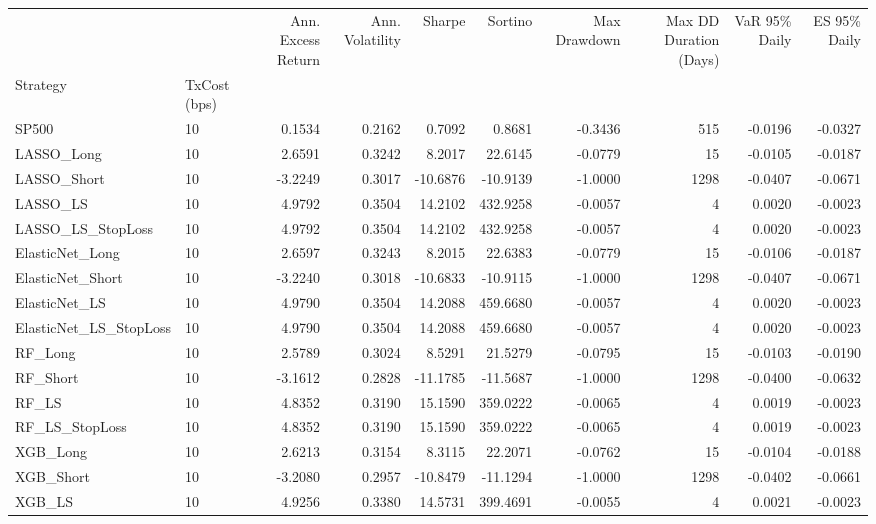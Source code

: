 \begin{tabular}{llrrrrrrrr}
\toprule
 &  & Ann. Excess Return & Ann. Volatility & Sharpe & Sortino & Max Drawdown & Max DD Duration (Days) & VaR 95\% Daily & ES 95\% Daily \\
Strategy & TxCost (bps) &  &  &  &  &  &  &  &  \\
\midrule
SP500 & 10 & 0.1534 & 0.2162 & 0.7092 & 0.8681 & -0.3436 & 515 & -0.0196 & -0.0327 \\
\cline{1-10}
LASSO\_Long & 10 & 2.6591 & 0.3242 & 8.2017 & 22.6145 & -0.0779 & 15 & -0.0105 & -0.0187 \\
\cline{1-10}
LASSO\_Short & 10 & -3.2249 & 0.3017 & -10.6876 & -10.9139 & -1.0000 & 1298 & -0.0407 & -0.0671 \\
\cline{1-10}
LASSO\_LS & 10 & 4.9792 & 0.3504 & 14.2102 & 432.9258 & -0.0057 & 4 & 0.0020 & -0.0023 \\
\cline{1-10}
LASSO\_LS\_StopLoss & 10 & 4.9792 & 0.3504 & 14.2102 & 432.9258 & -0.0057 & 4 & 0.0020 & -0.0023 \\
\cline{1-10}
ElasticNet\_Long & 10 & 2.6597 & 0.3243 & 8.2015 & 22.6383 & -0.0779 & 15 & -0.0106 & -0.0187 \\
\cline{1-10}
ElasticNet\_Short & 10 & -3.2240 & 0.3018 & -10.6833 & -10.9115 & -1.0000 & 1298 & -0.0407 & -0.0671 \\
\cline{1-10}
ElasticNet\_LS & 10 & 4.9790 & 0.3504 & 14.2088 & 459.6680 & -0.0057 & 4 & 0.0020 & -0.0023 \\
\cline{1-10}
ElasticNet\_LS\_StopLoss & 10 & 4.9790 & 0.3504 & 14.2088 & 459.6680 & -0.0057 & 4 & 0.0020 & -0.0023 \\
\cline{1-10}
RF\_Long & 10 & 2.5789 & 0.3024 & 8.5291 & 21.5279 & -0.0795 & 15 & -0.0103 & -0.0190 \\
\cline{1-10}
RF\_Short & 10 & -3.1612 & 0.2828 & -11.1785 & -11.5687 & -1.0000 & 1298 & -0.0400 & -0.0632 \\
\cline{1-10}
RF\_LS & 10 & 4.8352 & 0.3190 & 15.1590 & 359.0222 & -0.0065 & 4 & 0.0019 & -0.0023 \\
\cline{1-10}
RF\_LS\_StopLoss & 10 & 4.8352 & 0.3190 & 15.1590 & 359.0222 & -0.0065 & 4 & 0.0019 & -0.0023 \\
\cline{1-10}
XGB\_Long & 10 & 2.6213 & 0.3154 & 8.3115 & 22.2071 & -0.0762 & 15 & -0.0104 & -0.0188 \\
\cline{1-10}
XGB\_Short & 10 & -3.2080 & 0.2957 & -10.8479 & -11.1294 & -1.0000 & 1298 & -0.0402 & -0.0661 \\
\cline{1-10}
XGB\_LS & 10 & 4.9256 & 0.3380 & 14.5731 & 399.4691 & -0.0055 & 4 & 0.0021 & -0.0023 \\

\end{tabular}
